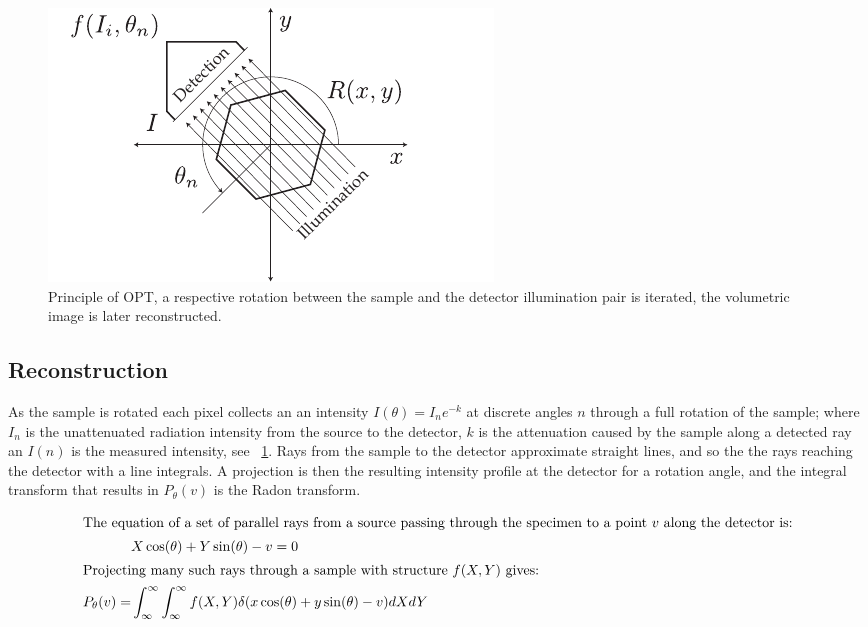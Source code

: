 \begin{figure}
  \centering
  \includegraphics{Chapters/flopt/Figs/PDF/OPT_digram}
  \caption[Principle of OPT]{Principle of OPT, a respective rotation between the sample and the detector illumination pair is iterated, the volumetric image is later reconstructed.}
  \label{fig:OPT_digram}
\end{figure}

\subsection{Reconstruction}

As the sample is rotated each pixel collects an an intensity $I(\theta) = I_{n}e^{-k}$ at discrete angles $n$ through a full rotation of the sample; where $I_{n}$ is the unattenuated radiation intensity from the source to the detector, $k$ is the attenuation caused by the sample along a detected ray an $I(n)$ is the measured intensity, see \figurename~\ref{fig:OPT_digram}.
Rays from the sample to the detector approximate straight lines, and so the the rays reaching the detector with a line integrals.
A projection is then the resulting intensity profile at the detector for a rotation angle, and the integral transform that results in \(P_\theta(v)\)
is the Radon transform.

\begin{align}
    \intertext{The equation of a set of parallel rays from a source passing through the specimen to a point \(v\) along the detector is:}
    &X\cos(\theta) + Y\sin(\theta) - v = 0 \\
    \intertext{Projecting many such rays through a sample with structure \(f(X,Y)\) gives:}
    P_\theta(v) = &\int_{\infty}^{\infty} \int_{\infty}^{\infty} f(X,Y)\delta (x\cos(\theta)+y \sin(\theta)-v)dX dY
\end{align}

